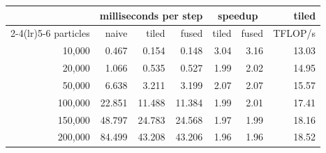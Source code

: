 \begin{tabular}{r rrr rr r}
\toprule
& \multicolumn{3}{c}{milliseconds per step} & \multicolumn{2}{c}{speedup} & tiled \\
\cmidrule(lr){2-4}\cmidrule(lr){5-6}
particles & naive & tiled & fused & tiled & fused & TFLOP/s \\
\midrule
10,000 & 0.467 & 0.154 & 0.148 & 3.04 & 3.16 & 13.03 \\
20,000 & 1.066 & 0.535 & 0.527 & 1.99 & 2.02 & 14.95 \\
50,000 & 6.638 & 3.211 & 3.199 & 2.07 & 2.07 & 15.57 \\
100,000 & 22.851 & 11.488 & 11.384 & 1.99 & 2.01 & 17.41 \\
150,000 & 48.797 & 24.783 & 24.568 & 1.97 & 1.99 & 18.16 \\
200,000 & 84.499 & 43.208 & 43.206 & 1.96 & 1.96 & 18.52 \\
\bottomrule
\end{tabular}

